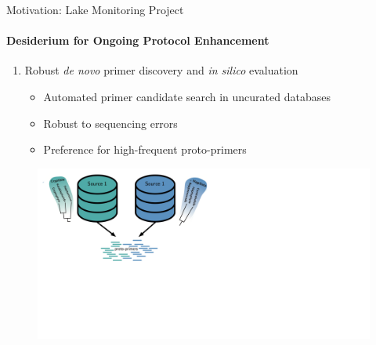 \documentclass[xcolor=dvipsnames,envcountsect]{beamer}
\begin{document}
\begin{frame}{Motivation: Lake Monitoring Project}
\framesubtitle{Desiderium for Ongoing Protocol Enhancement}
\begin{enumerate}[I]
    \item Robust {\it de novo} primer discovery and {\it in silico} evaluation %
    \begin{itemize}
        \item Automated primer candidate search in uncurated databases %
            \item Robust to sequencing errors
            \item Preference for high-frequent proto-primers
    \end{itemize}
\end{enumerate}
\begin{figure}
    \includegraphics[scale=.4]{DB_protoprimers}
\end{figure}
\end{frame}
\end{document}
